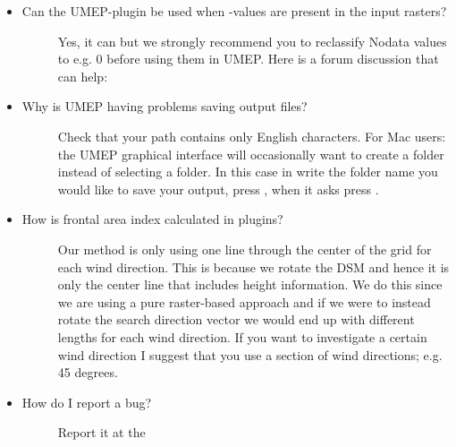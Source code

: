 \documentclass[letterpaper,10pt,english]{sphinxmanual}
\begin{document}
\begin{itemize}
\begin{description}
\end{description}

\item {} \begin{description}
\item[{Can the UMEP-plugin be used when -values are present in the input rasters?}] \leavevmode
Yes, it can but we strongly recommend you to reclassify Nodata values to e.g. 0 before using them in UMEP. Here is a forum discussion that can help: 

\end{description}

\item {} \begin{description}
\item[{Why is UMEP having problems saving output files?}] \leavevmode
Check that your path contains only English characters. For Mac users: the UMEP graphical interface will occasionally want to create a folder instead of selecting a folder. In this case in  write the folder name you would like to save your output, press , when it asks  press .

\end{description}

\item {} \begin{description}
\item[{How is frontal area index calculated in  plugins?}] \leavevmode
Our method is only using one line through the center of the grid for each wind direction. This is because we rotate the DSM and hence it is only the center line that includes height information. We do this since we are using a pure raster-based approach and if we were to instead rotate the search direction vector we would end up with different lengths for each wind direction. If you want to investigate a certain wind direction I suggest that you use a section of wind directions; e.g. 45 degrees.

\end{description}

\item {} \begin{description}
\item[{How do I report a bug?}] \leavevmode
Report it at the 


\end{description}
\end{itemize}
\end{document}
